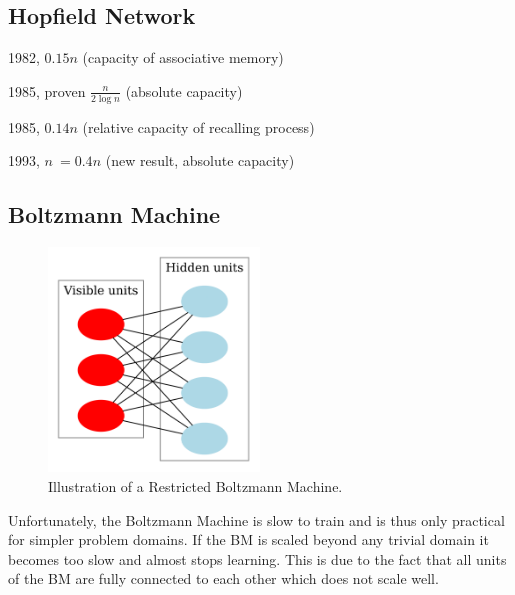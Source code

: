 \documentclass[12pt, a4paper]{article}
\begin{document}
\subsection{Hopfield Network}


1982, $0.15n$ (capacity of associative memory)


1985, proven $ \frac{n}{2\log{n}} $ (absolute capacity)

1985, $0.14n$ (relative capacity of recalling process)

1993, $ n ~= 0.4n $ (new result, absolute capacity)

\subsection{Boltzmann Machine}


\begin{figure}[htbp]
	\begin{center}
		\includegraphics[width=0.5\textwidth]{inc/Restricted_Boltzmann_machine.png}
		\caption{Illustration of a Restricted Boltzmann Machine.\protect\footnotemark}
		\label{fig:restricted_boltzmann_machine}
	\end{center}
\end{figure}

Unfortunately, the Boltzmann Machine is slow to train and is thus only practical for simpler problem domains. If the BM is scaled beyond any trivial domain it becomes too slow and almost stops learning. This is due to the fact that all units of the BM are fully connected to each other which does not scale well.
\end{document}
